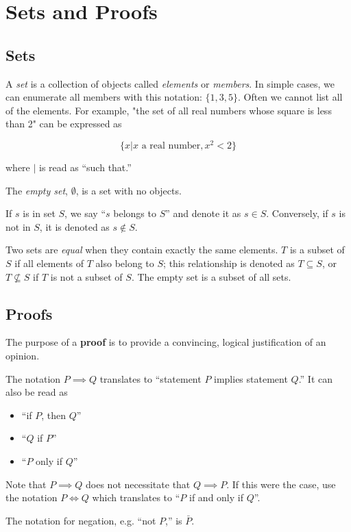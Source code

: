 \section{Sets and Proofs}

\subsection{Sets}

A \textit{set} is a collection of objects called \textit{elements} or \textit{members}.
In simple cases, we can enumerate all members with this notation: $\{1, 3, 5\}$.
Often we cannot list all of the elements.
For example, "the set of all real numbers whose square is less than 2" can be expressed as

$$
\{x | x \text{ a real number}, x^2 < 2\}
$$

\noindent where $|$ is read as ``such that.''

The \textit{empty set}, $\emptyset$, is a set with no objects.

If $s$ is in set $S$, we say ``$s$ belongs to $S$'' and denote it as $s \in S$.
Conversely, if $s$ is not in $S$, it is denoted as $s \notin S$.

Two sets are \textit{equal} when they contain exactly the same elements.
$T$ is a subset of $S$ if all elements of $T$ also belong to $S$; this relationship is denoted as $T \subseteq S$, or $T \nsubseteq S$ if $T$ is not a subset of $S$.
The empty set is a subset of all sets.

\subsection{Proofs}

The purpose of a \textbf{proof} is to provide a convincing, logical justification of an opinion.

The notation $P \implies Q$ translates to ``statement $P$ implies statement $Q$.''
It can also be read as \begin{itemize}
    \item ``if $P$, then $Q$''
    \item ``$Q$ if $P$''
    \item ``$P$ only if $Q$''
\end{itemize}
\noindent{}Note that $P \implies Q$ does not necessitate that $Q \implies P$.
If this were the case, use the notation $P \iff Q$ which translates to ``$P$ if and only if $Q$''.

The notation for negation, e.g. ``not $P$,'' is $\bar{P}$.

